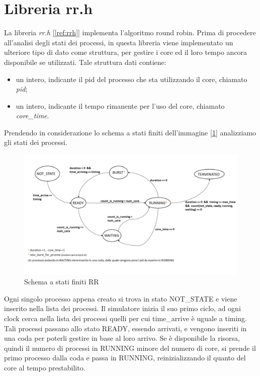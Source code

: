 \documentclass[Lau, oneside]{sapthesis}%
\begin{document}
\section{Libreria rr.h}
\label{sec:rr.h}
La libreria \textit{rr.h} \hyperref[ref:rrh]{[\ref*{ref:rrh}]} implementa l'algoritmo round robin.
Prima di procedere all'analisi degli stati dei processi, in questa libreria viene implementato un ulteriore tipo di dato come struttura, per gestire i core ed il loro tempo ancora disponibile se utilizzati.
Tale struttura dati contiene:
\begin{itemize}
    \item un intero, indicante il pid del processo che sta utilizzando il core, chiamato \textit{pid};
    \item un intero, indicante il tempo rimanente per l'uso del core, chiamato \textit{core\_time}.
\end{itemize}
Prendendo in considerazione lo schema a stati finiti dell'immagine \hyperref[figura:rr]{[\ref*{figura:rr}]} analizziamo gli stati dei processi.
\begin{figure}[ht!]
  \centering
  \includegraphics[width=1\textwidth]{schema a stati finiti RR.JPG}
  \caption{Schema a stati finiti RR}
  \label{figura:rr}
\end{figure}
Ogni singolo processo appena creato si trova in stato NOT\_STATE e viene inserito nella lista dei processi.
Il simulatore inizia il suo primo ciclo, ad ogni clock cerca nella lista dei processi quelli per cui time\_arrive è uguale a timing.
Tali processi passano allo stato READY, essendo arrivati, e vengono inseriti in una coda per poterli gestire in base al loro arrivo.
Se è disponibile la risorsa, quindi il numero di processi in RUNNING  minore del numero di core, si prende il primo processo dalla coda e passa in RUNNING, reinizializzando il quanto del core al tempo prestabilito.
\end{document}
